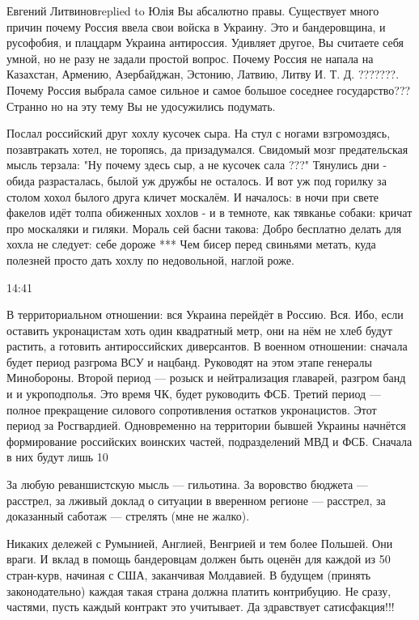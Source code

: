 Евгений Литвиновreplied to Юлія
Вы абсалютно правы. Существует много причин почему Россия ввела свои войска в Украину. Это и бандеровщина, и русофобия, и плацдарм Украина антироссия. Удивляет другое, Вы считаете себя умной, но не разу не задали простой вопрос. Почему Россия не напала на Казахстан, Армению, Азербайджан, Эстонию, Латвию, Литву И. Т. Д. ???????. Почему Россия выбрала самое сильное и самое большое соседнее государство??? Странно но на эту тему Вы не удосужились подумать.

Послал российский друг хохлу кусочек сыра.
На стул с ногами взгромоздясь, позавтракать хотел, не торопясь, да призадумался. Свидомый мозг предательская мысль терзала: "Ну почему здесь сыр, а не кусочек сала ???"
Тянулись дни - обида разрасталась, былой уж дружбы не осталось.
И вот уж под горилку за столом хохол былого друга кличет москалём.
И началось: в ночи при свете факелов идёт толпа обиженных хохлов - и в темноте, как тявканье собаки: кричат про москаляки и гиляки.
Мораль сей басни такова:
Добро бесплатно делать для хохла не следует: себе дороже
***
Чем бисер перед свиньями метать, куда полезней просто дать хохлу по недовольной, наглой роже.


14:41

В территориальном отношении: вся Украина перейдёт в Россию. Вся. Ибо, если оставить укронацистам хоть один квадратный метр, они на нём не хлеб будут растить, а готовить антироссийских диверсантов.
В военном отношении: сначала будет период разгрома ВСУ и нацбанд. Руководят на этом этапе генералы Минобороны. Второй период — розыск и нейтрализация главарей, разгром банд и и укроподполья. Это время ЧК, будет руководить ФСБ. Третий период — полное прекращение силового сопротивления остатков укронацистов. Этот период за Росгвардией. Одновременно на территории бывшей Украины начнётся формирование российских воинских частей, подразделений МВД и ФСБ. Сначала в них будут лишь 10%

 За любую реваншистскую мысль — гильотина. За воровство бюджета — расстрел, за лживый доклад о ситуации в вверенном регионе — расстрел, за доказанный саботаж — стрелять (мне не жалко).

Никаких дележей с Румынией, Англией, Венгрией и тем более Польшей. Они враги. И вклад в помощь бандеровцам должен быть оценён для каждой из 50 стран-курв, начиная с США, заканчивая Молдавией. В будущем (принять законодательно) каждая такая страна должна платить контрибуцию. Не сразу, частями, пусть каждый контракт это учитывает. Да здравствует сатисфакция!!!

